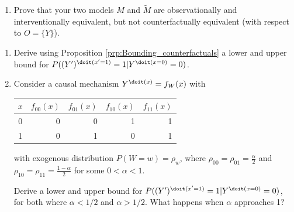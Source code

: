 \begin{enumerate}[label=12.\arabic*]
\begin{enumerate}
		\item Prove that your two models $M$ and $\tilde{M}$ are observationally and interventionally equivalent, but not counterfactually equivalent (with respect to $O = \{Y\}$).
	\end{enumerate}
	\begin{enumerate}[resume*]
		\item Derive using Proposition \ref*{prp:Bounding_counterfactuals} a lower and upper bound for $P((Y')^{\doit(x'=1)}=1|Y^{\doit(x=0)}=0)$.
		\item Consider a causal mechanism $Y^{\doit(x)} = f_W(x)$ with
		\begin{center}\begin{tabular}{c|rrrr}
				$x$ & $f_{00}(x)$ & $f_{01}(x)$ & $f_{10}(x)$ & $f_{11}(x)$ \\
				\hline
				0   & 0           & 0           & 1           & 1           \\
				1   & 0           & 1           & 0           & 1
			\end{tabular}\end{center}
		with exogenous distribution $P(W=w) = \rho_w$, where $\rho_{00} = \rho_{01} = \tfrac{\alpha}{2}$ and $\rho_{10}=\rho_{11}=\tfrac{1-\alpha}{2}$ for some $0 < \alpha < 1$.

		Derive a lower and upper bound for $P((Y')^{\doit(x'=1)}=1|Y^{\doit(x=0)}=0)$, for both where $\alpha < 1/2$ and $\alpha > 1/2$. What happens when $\alpha$ approaches 1?
	\end{enumerate}



\end{enumerate}
